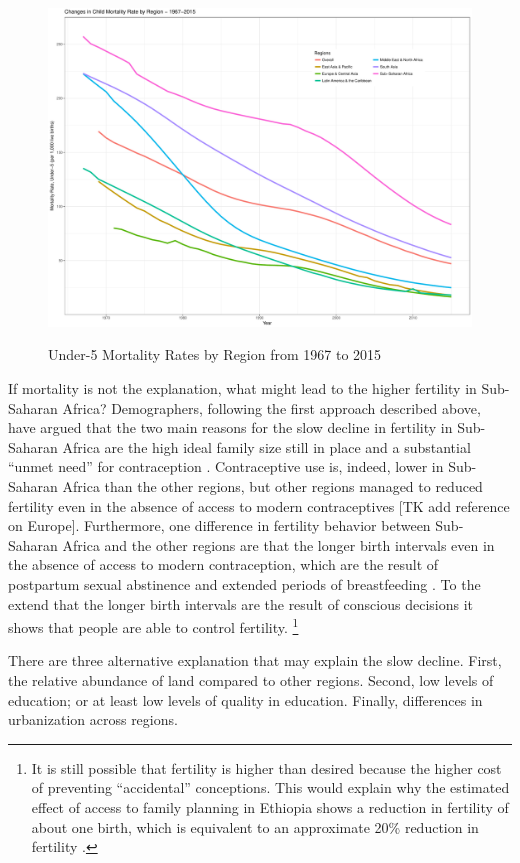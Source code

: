 \documentclass[letterpaper,12pt]{article}
\begin{document}
\begin{figure}[hp]
    \centering
    \caption{Under-5 Mortality Rates by Region from 1967 to 2015}
    \includegraphics[width=0.75\linewidth]{childMortalityRates}
    \label{fig:mortality}
\end{figure}

If mortality is not the explanation, what might lead to the
higher fertility in Sub-Saharan Africa?
Demographers, following the first approach described above, 
have argued that the two main reasons for the slow decline 
in fertility in Sub-Saharan Africa are the high ideal family 
size still in place and a substantial ``unmet need'' for contraception  
\citep{Bongaarts2013a}.
Contraceptive use is, indeed, lower in Sub-Saharan Africa than
the other regions, but other regions managed to reduced fertility
even in the absence of access to modern contraceptives 
[TK add reference on Europe].
Furthermore, one difference in fertility behavior between 
Sub-Saharan Africa and the other regions are that the longer 
birth intervals even in the absence of access to modern 
contraception, which are the result of postpartum sexual 
abstinence and extended periods of breastfeeding \citep{Caldwell1992}.
To the extend that the longer birth intervals are the result
of conscious decisions it shows that people are able to
control fertility.%
\footnote{
It is still possible that fertility is higher than desired
because the higher cost of preventing ``accidental''
conceptions.
This would explain why the estimated effect of access to 
family planning in Ethiopia shows a reduction in fertility
of about one birth, which is equivalent to an approximate
20\% reduction in fertility \citet{Portner2014a}.
}


There are three alternative explanation that may explain the
slow decline.
First, the relative abundance of land compared to other regions.
Second, low levels of education; or at least low levels of quality
in education.
Finally, differences in urbanization across regions.  
\end{document}
